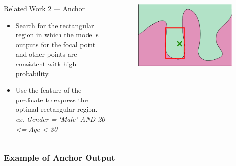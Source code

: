 \documentclass[aspectratio=169]{slide-ja}
\begin{document}
\begin{frame}{}
  \begin{columns}[]
    \begin{column}{0.5\textwidth}
      Related Work 2 — Anchor
      \begin{itemize}
        \item Search for the rectangular region in which the model's outputs
              for the focal point and other points are consistent with high
              probability.
        \item Use the feature of the predicate to express the optimal
              rectangular region. \\
              \textit{\footnotesize{ex. Gender = ‘Male’ AND 20 <= Age < 30}}
      \end{itemize}

      \bigskip
    \end{column}
    \begin{column}{0.5\textwidth}
      \begin{figure}
        \includegraphics[scale=0.35]{visual-anchor}
      \end{figure}
    \end{column}
  \end{columns}
\end{frame}

\subsubsection{Example of Anchor Output}
\end{document}
